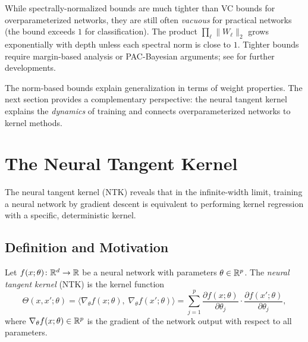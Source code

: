\documentclass[11pt,a4paper]{article}
\begin{document}
\begin{warning}[title={Norm-Based Bounds Can Still Be Loose}]
While spectrally-normalized bounds are much tighter than VC bounds
for overparameterized networks, they are still often \emph{vacuous}
for practical networks (the bound exceeds $1$ for classification).
The product $\prod_\ell \|W_\ell\|_2$ grows exponentially with depth
unless each spectral norm is close to $1$.  Tighter bounds require
margin-based analysis or PAC-Bayesian arguments; see
\citet{neyshabur2015} for further developments.
\end{warning}

The norm-based bounds explain generalization in terms of weight
properties.  The next section provides a complementary perspective:
the neural tangent kernel explains the \emph{dynamics} of training
and connects overparameterized networks to kernel methods.

\section{The Neural Tangent Kernel}
\label{sec:ntk}

The neural tangent kernel (NTK) reveals that in the infinite-width
limit, training a neural network by gradient descent is equivalent
to performing kernel regression with a specific, deterministic kernel.

\subsection{Definition and Motivation}

\begin{definition}
\label{def:ntk}
Let $f(x; \theta) \colon \mathbb{R}^d \to \mathbb{R}$ be a neural network with
parameters $\theta \in \mathbb{R}^p$.  The \emph{neural tangent kernel}
(NTK) is the kernel function
\begin{equation}
\label{eq:ntk-def}
  \Theta(x, x'; \theta) = \bigl\langle
    \nabla_\theta f(x; \theta), \;
    \nabla_\theta f(x'; \theta) \bigr\rangle
  = \sum_{j=1}^{p} \frac{\partial f(x; \theta)}{\partial \theta_j}
    \cdot \frac{\partial f(x'; \theta)}{\partial \theta_j},
\end{equation}
where $\nabla_\theta f(x; \theta) \in \mathbb{R}^p$ is the gradient of the
network output with respect to all parameters.
\end{definition}
\end{document}
